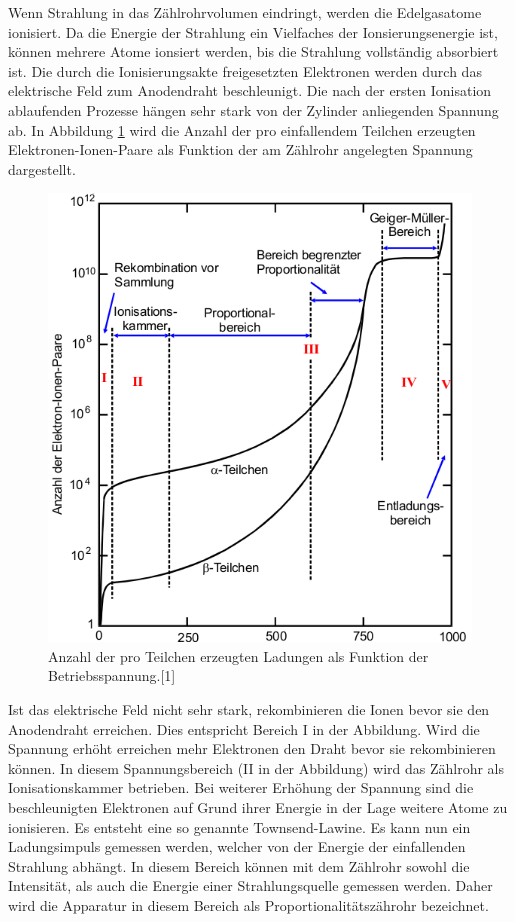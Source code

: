 \documentclass[11pt,ngerman,a4paper]{article}
\begin{document}
 \noindent
 Wenn Strahlung in das Zählrohrvolumen eindringt, werden die Edelgasatome ionisiert. Da die Energie der Strahlung ein Vielfaches der Ionsierungsenergie ist, können mehrere Atome ionsiert werden, bis die Strahlung vollständig absorbiert ist. Die durch die Ionisierungsakte freigesetzten Elektronen werden durch das elektrische Feld  zum Anodendraht beschleunigt.
Die nach der ersten Ionisation ablaufenden Prozesse hängen sehr stark von der Zylinder anliegenden Spannung ab. In Abbildung \ref{abb2} wird die Anzahl der pro einfallendem Teilchen erzeugten Elektronen-Ionen-Paare als Funktion der am Zählrohr angelegten Spannung dargestellt.
\begin{figure}[htp]
\centering
\includegraphics[scale=0.5]{abb2.png}
\caption{Anzahl der pro Teilchen erzeugten Ladungen als Funktion der Betriebsspannung.[1]}
\label{abb2}
\end{figure}
Ist das elektrische Feld nicht sehr stark, rekombinieren die Ionen bevor sie den Anodendraht erreichen. Dies entspricht Bereich I in der Abbildung. Wird die Spannung erhöht erreichen mehr Elektronen den Draht bevor sie rekombinieren können. In diesem Spannungsbereich (II in der Abbildung) wird das Zählrohr als Ionisationskammer betrieben. Bei weiterer Erhöhung der Spannung sind  die beschleunigten Elektronen auf Grund ihrer Energie in der Lage weitere Atome zu ionisieren. Es entsteht eine so genannte Townsend-Lawine. Es kann nun ein Ladungsimpuls gemessen werden, welcher von der Energie der einfallenden Strahlung abhängt. In diesem Bereich können mit dem Zählrohr sowohl die Intensität, als auch die Energie einer Strahlungsquelle gemessen werden. Daher wird die Apparatur in diesem Bereich als Proportionalitätszährohr bezeichnet. 
\end{document}

